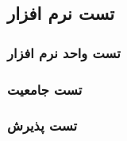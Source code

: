 \subsection{تست نرم افزار}


\subsubsection{تست واحد نرم افزار}

\subsubsection{تست جامعیت}

\subsubsection{تست پذیرش}
